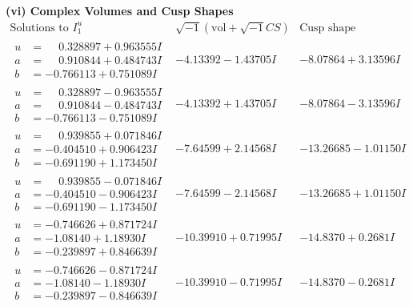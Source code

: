 \documentclass[1p]{elsarticle_modified}
\theoremstyle{definition}
\newcommand{\I}{\sqrt{-1}}
\begin{document}
\newpage\flushleft \textbf{(vi) Complex Volumes and Cusp Shapes}
$$\begin{array}{c|c|c}  
\text{Solutions to }I^u_{1}& \I (\text{vol} + \sqrt{-1}CS) & \text{Cusp shape}\\
 \hline 
\begin{aligned}
u &= \phantom{-}0.328897 + 0.963555 I \\
a &= \phantom{-}0.910844 + 0.484743 I \\
b &= -0.766113 + 0.751089 I\end{aligned}
 & -4.13392 - 1.43705 I & -8.07864 + 3.13596 I \\ \hline\begin{aligned}
u &= \phantom{-}0.328897 - 0.963555 I \\
a &= \phantom{-}0.910844 - 0.484743 I \\
b &= -0.766113 - 0.751089 I\end{aligned}
 & -4.13392 + 1.43705 I & -8.07864 - 3.13596 I \\ \hline\begin{aligned}
u &= \phantom{-}0.939855 + 0.071846 I \\
a &= -0.404510 + 0.906423 I \\
b &= -0.691190 + 1.173450 I\end{aligned}
 & -7.64599 + 2.14568 I & -13.26685 - 1.01150 I \\ \hline\begin{aligned}
u &= \phantom{-}0.939855 - 0.071846 I \\
a &= -0.404510 - 0.906423 I \\
b &= -0.691190 - 1.173450 I\end{aligned}
 & -7.64599 - 2.14568 I & -13.26685 + 1.01150 I \\ \hline\begin{aligned}
u &= -0.746626 + 0.871724 I \\
a &= -1.08140 + 1.18930 I \\
b &= -0.239897 + 0.846639 I\end{aligned}
 & -10.39910 + 0.71995 I & -14.8370 + 0.2681 I \\ \hline\begin{aligned}
u &= -0.746626 - 0.871724 I \\
a &= -1.08140 - 1.18930 I \\
b &= -0.239897 - 0.846639 I\end{aligned}
 & -10.39910 - 0.71995 I & -14.8370 - 0.2681 I \\ \hline\begin{aligned}

\end{aligned}
\end{array}$$
\end{document}
